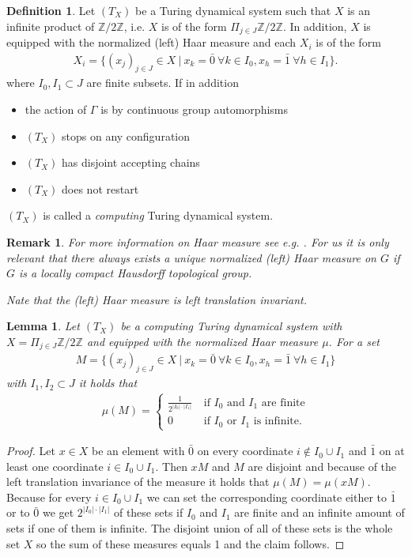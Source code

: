 \documentclass[12pt,a4paper]{scrartcl}
\theoremstyle{plain}
\newtheorem{Lemma}[Theorem]{Lemma}
\newtheorem{Remark}[Theorem]{Remark}
\theoremstyle{definition}
\newtheorem{Definition}[Theorem]{Definition}
\newcommand{\2}{\mathbb{Z} / 2 \mathbb{Z}}
\newcommand{\1}{\bar{1}}
\newcommand{\0}{\bar{0}}
\begin{document}
\begin{Definition}
	Let $(T_X)$ be a Turing dynamical system such that $X$ is an infinite product of $\2$, i.e. $X$ is of the form $ \Pi_{j \in J} \2$. In addition, $X$ is equipped with the normalized (left) Haar measure and each $X_i$ is of the form 
	\begin{align*}
		X_i = \{(x_j)_{j \in J} \in X \ | \ x_k = \0 \ \forall k \in I_0, x_h = \1 \ \forall h \in I_1\}.
	\end{align*}
	where $I_0, I_1 \subset J$ are finite subsets.
	If in addition
	\begin{itemize}
		\item the action of $\Gamma$ is by continuous group automorphisms
		\item $(T_X)$ stops on any configuration
		\item $(T_X)$ has disjoint accepting chains
		\item $(T_X)$ does not restart
	\end{itemize}
	$(T_X)$ is called a \emph{computing} Turing dynamical system.
\end{Definition}
\begin{Remark}
	For more information on Haar measure see e.g. . For us it is only relevant that there always exists a unique normalized (left) Haar measure on $G$ if $G$ is a locally compact Hausdorff topological group.
	
	Nate that the (left) Haar measure is left translation invariant.
\end{Remark}
\begin{Lemma}
	Let $(T_X)$ be a computing Turing dynamical system with $X = \Pi_{j \in J} \2$ and equipped with the normalized Haar measure $\mu$. For a set 
	\begin{align*}
		M = \{(x_j)_{j \in J} \in X \ | \ x_k = \0 \ \forall k \in I_0, x_h = \1 \ \forall h \in I_1 \}
	\end{align*}
	with $I_1, I_2 \subset J$ it holds that
	\begin{align*}
	\mu (M) = \begin{cases}
	\frac{1}{2^{|I_0| \cdot |I_1|}} & ~\text{if $I_0$ and $I_1$ are finite} \\
	0 & ~ \text{if $I_0$ or $I_1$ is infinite.}
	\end{cases}
	\end{align*}
\end{Lemma}
\begin{proof}
	Let $x \in X$ be an element with $\0$ on every coordinate $i \notin I_0 \cup I_1$ and $\1$ on at least one coordinate $i \in I_0 \cup I_1$. Then $xM$ and $M$ are disjoint and because of the left translation invariance of the measure it holds that $\mu (M) = \mu (xM)$. Because for every $i \in I_0 \cup I_1$ we can set the corresponding coordinate either to $\1$ or to $\0$ we get $2^{|I_0| \cdot |I_1|}$ of these sets if $I_0$ and $I_1$ are finite and an infinite amount of sets if one of them is infinite. The disjoint union of all of these sets is the whole set $X$ so the sum of these measures equals 1 and the claim follows.
\end{proof}
 
\end{document}
